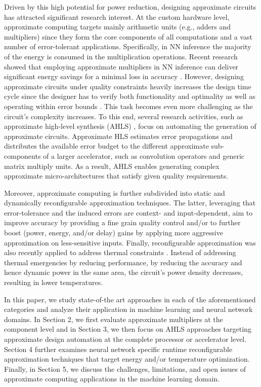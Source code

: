 Driven by this high potential for power reduction, designing approximate circuits has attracted significant research interest. At the custom hardware level, approximate computing targets mainly arithmetic units \cite{miao2012modeling, shafique2015low, zervakis2019vader, saadat2018minimally} (e.g., adders and multipliers) since they form the core components of all computations and a vast number of error-tolerant applications. Specifically, in NN inference the majority of the energy is consumed in the multiplication operations. Recent research showed that employing approximate multipliers in NN inference can deliver significant energy savings for a minimal loss in accuracy \cite{saadat2018minimally, sarwar2018energy, tasoulas2020weight}. However, designing approximate circuits under quality constraints heavily increases the design time cycle since the designer has to verify both functionality and optimality as well as operating within error bounds \cite{zervakis2018multi}. This task becomes even more challenging as the circuit’s complexity increases. To this end, several research activities, such as approximate high-level synthesis (AHLS) \cite{lee2017high}, focus on automating the generation of approximate circuits. Approximate HLS estimates error propagations and distributes the available error budget to the different approximate sub-components of a larger accelerator, such as convolution operators and generic matrix multiply units. As a result, AHLS enables generating complex approximate micro-architectures that satisfy given quality requirements.

Moreover, approximate computing is further subdivided into static and dynamically reconfigurable approximation techniques. The latter, leveraging that error-tolerance and the induced errors are context- and input-dependent, aim to improve accuracy by providing a fine grain quality control and/or to further boost (power, energy, and/or delay) gains by applying more aggressive approximation on less-sensitive inputs. Finally, reconfigurable approximation was also recently applied to address thermal constraints \cite{amrouch2020npu}. Instead of addressing thermal emergencies by reducing performance, by reducing the accuracy and hence dynamic power in the same area, the circuit’s power density decreases, resulting in lower temperatures.

In this paper, we study state-of-the art approaches in each of the aforementioned categories and analyze their application in machine learning and neural network domains. In Section 2, we first evaluate approximate multipliers \cite{saadat2018minimally} at the component level and in Section 3, we then focus on AHLS \cite{lee2017high} approaches targeting approximate design automation at the complete processor or accelerator level. Section 4 further examines neural network specific runtime reconfigurable approximation techniques that target energy and/or temperature optimization. Finally, in Section 5, we discuss the challenges, limitations, and open issues of approximate computing applications in the machine learning domain.




